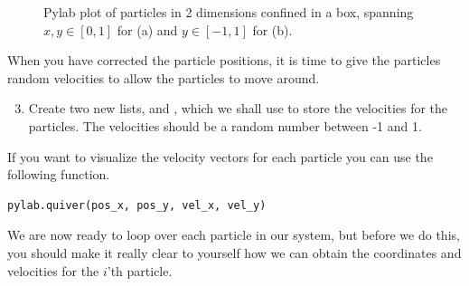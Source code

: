 \documentclass{article}
\begin{document}
\begin{figure}[htb]
  \centering
  \caption{
    Pylab plot of particles in 2 dimensions confined in a box,
    spanning $x, y \in [0,1]$ for (a) and $y \in [-1,1]$ for (b).
  }
\end{figure}


\newpage

When you have corrected the particle positions, it is time to give the
particles random velocities to allow the particles to move around.

\begin{enumerate}
  \setcounter{enumi}{2}
  \item Create
    two new lists,  and , which we shall use to
    store the velocities for the particles.
    The velocities should be a random number between -1 and 1.
\end{enumerate}

If you want to visualize the velocity vectors for each particle you can
use the following function.\\

\begin{lstlisting}
pylab.quiver(pos_x, pos_y, vel_x, vel_y)
\end{lstlisting}

We are now ready to loop over each particle in our system, but before we do
this, you should make it really clear to yourself how we can obtain the
coordinates and velocities for the $i$'th particle.
\end{document}
